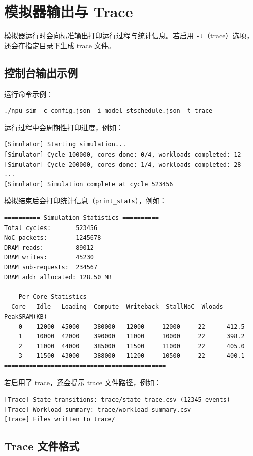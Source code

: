 \section{模拟器输出与 Trace}

模拟器运行时会向标准输出打印运行过程与统计信息。若启用 \texttt{-t}（trace）选项，还会在指定目录下生成 trace 文件。

\subsection{控制台输出示例}

运行命令示例：
\begin{verbatim}
./npu_sim -c config.json -i model_stschedule.json -t trace
\end{verbatim}

运行过程中会周期性打印进度，例如：
\begin{verbatim}
[Simulator] Starting simulation...
[Simulator] Cycle 100000, cores done: 0/4, workloads completed: 12
[Simulator] Cycle 200000, cores done: 1/4, workloads completed: 28
...
[Simulator] Simulation complete at cycle 523456
\end{verbatim}

模拟结束后会打印统计信息（\texttt{print\_stats}），例如：
{\small
\begin{verbatim}
========== Simulation Statistics ==========
Total cycles:       523456
NoC packets:        1245678
DRAM reads:         89012
DRAM writes:        45230
DRAM sub-requests:  234567
DRAM addr allocated: 128.50 MB

--- Per-Core Statistics ---
  Core   Idle   Loading  Compute  Writeback  StallNoC  Wloads  PeakSRAM(KB)
    0    12000  45000    380000   12000     12000     22      412.5
    1    10000  42000    390000   11000     10000     22      398.2
    2    11000  44000    385000   11500     11000     22      405.0
    3    11500  43000    388000   11200     10500     22      400.1
=============================================
\end{verbatim}
}

若启用了 trace，还会提示 trace 文件路径，例如：
\begin{verbatim}
[Trace] State transitions: trace/state_trace.csv (12345 events)
[Trace] Workload summary: trace/workload_summary.csv
[Trace] Files written to trace/
\end{verbatim}

\subsection{Trace 文件格式}

